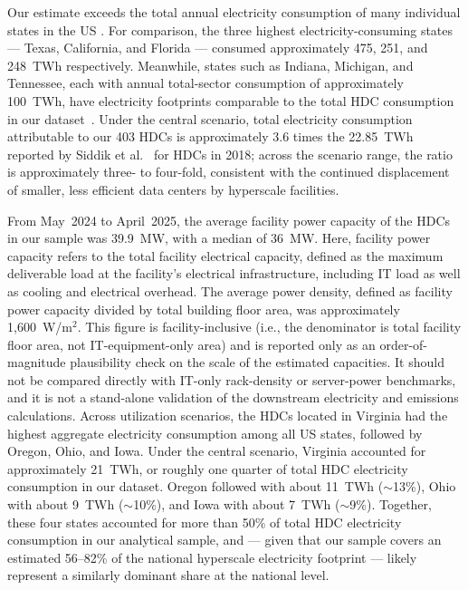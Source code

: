 \documentclass[12pt]{article}
\begin{document}
Our estimate exceeds the total annual electricity consumption of many individual states in the US \cite{EIA_fuel_use}. For comparison, the three highest electricity-consuming states — Texas, California, and Florida — consumed approximately 475, 251, and 248~TWh respectively. Meanwhile, states such as Indiana, Michigan, and Tennessee, each with annual total-sector consumption of approximately 100~TWh, have electricity footprints comparable to the total HDC consumption in our dataset~\cite{EIA_fuel_use}. Under the central scenario, total electricity consumption attributable to our 403 HDCs is approximately 3.6 times the 22.85~TWh reported by Siddik et al.~\cite{siddik2021environmental} for HDCs in 2018; across the scenario range, the ratio is approximately three- to four-fold, consistent with the continued displacement of smaller, less efficient data centers by hyperscale facilities.

From May~2024 to April~2025, the average facility power capacity of the HDCs in our sample was 39.9~MW, with a median of 36~MW. Here, facility power capacity refers to the total facility electrical capacity, defined as the maximum deliverable load at the facility’s electrical infrastructure, including IT load as well as cooling and electrical overhead. The average power density, defined as facility power capacity divided by total building floor area, was approximately 1{,}600~W/m$^{2}$. This figure is facility-inclusive (i.e., the denominator is total facility floor area, not IT-equipment-only area) and is reported only as an order-of-magnitude plausibility check on the scale of the estimated capacities. It should not be compared directly with IT-only rack-density or server-power benchmarks, and it is not a stand-alone validation of the downstream electricity and emissions calculations. Across utilization scenarios, the HDCs located in Virginia had the highest aggregate electricity consumption among all US states, followed by Oregon, Ohio, and Iowa. Under the central scenario, Virginia accounted for approximately 21~TWh, or roughly one quarter of total HDC electricity consumption in our dataset. Oregon followed with about 11~TWh ($\sim$13\%), Ohio with about 9~TWh ($\sim$10\%), and Iowa with about 7~TWh ($\sim$9\%). Together, these four states accounted for more than 50\% of total HDC electricity consumption in our analytical sample, and — given that our sample covers an estimated 56--82\% of the national hyperscale electricity footprint — likely represent a similarly dominant share at the national level.
\end{document}
